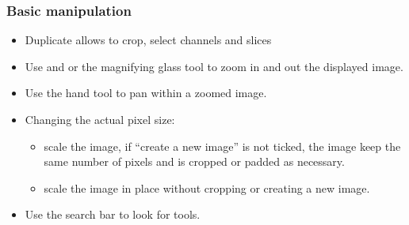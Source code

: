 \documentclass[ignorenonframetext,aspectratio=169,10pt,xcolor=table]{beamer}
\begin{document}
\begin{frame} \frametitle{Basic manipulation}

  \begin{itemize} \setlength\itemsep{1.5em}
    \item Duplicate  allows to crop, select
          channels and slices
    \item Use \keys{{+}} and \keys{-} or the magnifying glass tool to zoom
          in and out the displayed image.
    \item Use the hand tool to pan within a zoomed image.
    \item Changing the actual pixel size:
          \begin{itemize}
            \item {} scale the image, if ``create a new
                  image'' is not ticked, the image keep the same number of pixels and is
                  cropped or padded as necessary.
            \item {} scale the image in place
                  without cropping or creating a new image.
          \end{itemize}
    \item Use the search bar to look for tools.
  \end{itemize}

\end{frame}
\end{document}
